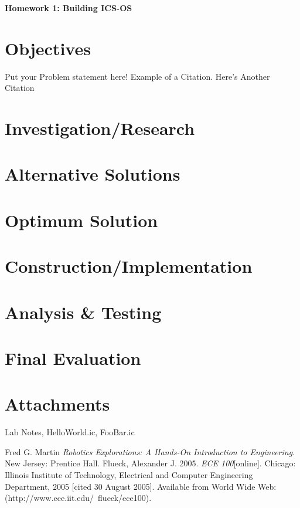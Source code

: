 \documentclass[a4paper, 11pt,oneside]{article}
\begin{document}
\begin{center}
{\LARGE \textbf{Homework 1: Building ICS-OS}}
\end{center}


\section*{Objectives}
Put your Problem statement here! Example of a Citation\cite[p.219]{Robotics}. Here's Another Citation\cite{Flueck}

\section{Investigation/Research}
\lipsum[2]

\section{Alternative Solutions}
\lipsum[3]

\section{Optimum Solution}
\lipsum[4]

\section{Construction/Implementation}
\lipsum[5]

\section{Analysis \& Testing}
\lipsum[6]

\section{Final Evaluation}
\lipsum[7]

\section{Attachments}
Lab Notes, HelloWorld.ic, FooBar.ic

\begin{thebibliography}{9}
 Fred G. Martin \emph{Robotics Explorations: A Hands-On Introduction to Engineering}. New Jersey: Prentice Hall.
  Flueck, Alexander J. 2005. \emph{ECE 100}[online]. Chicago: Illinois Institute of Technology, Electrical and Computer Engineering Department, 2005 [cited 30
August 2005]. Available from World Wide Web: (http://www.ece.iit.edu/~flueck/ece100).
\end{thebibliography}
\end{document}
